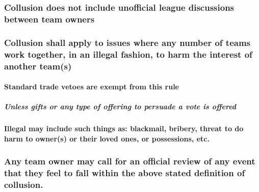 \documentclass[]{book}
\let\oldparagraph\paragraph
\renewcommand{\paragraph}[1]{\oldparagraph{#1}\mbox{}}
\let\oldsubparagraph\subparagraph
\renewcommand{\subparagraph}[1]{\oldsubparagraph{#1}\mbox{}}
\begin{document}
\hypertarget{collusion-does-not-include-unofficial-league-discussions-between-team-owners}{%
\subsubsection{Collusion does not include unofficial league discussions between team owners}\label{collusion-does-not-include-unofficial-league-discussions-between-team-owners}}

\hypertarget{collusion-shall-apply-to-issues-where-any-number-of-teams-work-together-in-an-illegal-fashion-to-harm-the-interest-of-another-teams}{%
\subsubsection{Collusion shall apply to issues where any number of teams work together, in an illegal fashion, to harm the interest of another team(s)}\label{collusion-shall-apply-to-issues-where-any-number-of-teams-work-together-in-an-illegal-fashion-to-harm-the-interest-of-another-teams}}

\hypertarget{standard-trade-vetoes-are-exempt-from-this-rule}{%
\paragraph{Standard trade vetoes are exempt from this rule}\label{standard-trade-vetoes-are-exempt-from-this-rule}}

\hypertarget{unless-gifts-or-any-type-of-offering-to-persuade-a-vote-is-offered}{%
\subparagraph{Unless gifts or any type of offering to persuade a vote is offered}\label{unless-gifts-or-any-type-of-offering-to-persuade-a-vote-is-offered}}

\hypertarget{illegal-may-include-such-things-as-blackmail-bribery-threat-to-do-harm-to-owners-or-their-loved-ones-or-possessions-etc.}{%
\paragraph{Illegal may include such things as: blackmail, bribery, threat to do harm to owner(s) or their loved ones, or possessions, etc.}\label{illegal-may-include-such-things-as-blackmail-bribery-threat-to-do-harm-to-owners-or-their-loved-ones-or-possessions-etc.}}

\hypertarget{any-team-owner-may-call-for-an-official-review-of-any-event-that-they-feel-to-fall-within-the-above-stated-definition-of-collusion.}{%
\subsubsection{Any team owner may call for an official review of any event that they feel to fall within the above stated definition of collusion.}\label{any-team-owner-may-call-for-an-official-review-of-any-event-that-they-feel-to-fall-within-the-above-stated-definition-of-collusion.}}
\end{document}
